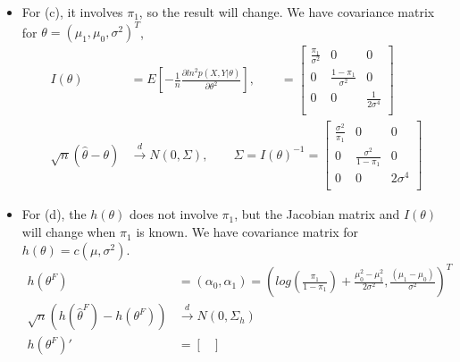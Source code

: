 \documentclass[11pt]{article} %
\begin{document}
\begin{itemize}
\begin{itemize}
\begin{align*}
\begin{bmatrix}
				\sum_{i=1}^n \pi_1 (1-\pi_1)x_i &  \sum_{i=1}^n \pi_1 (1-\pi_1)x_ix_i^T\\
			\end{bmatrix}\\
			Cov(\alpha) &= I_n(\alpha)^{-1} = \frac{1}{[\sum_{i=1}^n n x_i^2 - (\sum_{i=1}^n x_i)^2]\pi_1 (1-\pi_1)}  \begin{bmatrix}
				\sum_{i=1}^n n x_i^2 &   -\sum_{i=1}^n x_i\\
				-\sum_{i=1}^n x_i\sum_{i=1}^n \pi_1 (1-\pi_1)x_i & n\\
			\end{bmatrix}
		\end{align*} 
		\item[(ii)] For (c), it involves $\pi_1$, so the result will change. We have covariance matrix for $\theta = (\mu_1, \mu_0, \sigma^2)^T$, 
		\begin{align*}    
			I(\theta) &= E[- \frac{1}{n} \frac{\partial ln^2 p(X,Y|\theta)}{\partial \theta^2}], \qquad
			= \begin{bmatrix}
				\frac{\pi_1}{\sigma^2} & 0 & 0\\
				0 & \frac{1-\pi_1}{\sigma^2} & 0\\
				0 & 0 & \frac{1}{2\sigma^4} \\
			\end{bmatrix}\\
			\sqrt{n} (\hat{\theta} - \theta) & \xrightarrow[]{d} N \left(0, \Sigma \right), \qquad
			\Sigma = I(\theta)^{-1} = \begin{bmatrix}
				\frac{\sigma^2}{ \pi_1} & 0 & 0\\
				0 & \frac{\sigma^2}{ 1-\pi_1} & 0\\
				0 & 0 & 2\sigma^4 \\
			\end{bmatrix}
		\end{align*} 
		\item[(iii)] For (d), the $h(\theta)$ does not involve $\pi_1$, but the Jacobian matrix and $I(\theta)$ will change when $\pi_1$ is known. We have covariance matrix for $h(\theta) = c(\mu, \sigma^2)$.
		\begin{align*}    
			h(\theta^F ) &= (\alpha_0, \alpha_1)= \left(log(\frac{\pi_1}{1-\pi_1}) +\frac{\mu_0^2 - \mu_1^2}{2\sigma^2},  \frac{(\mu_1-\mu_0)}{\sigma^2} \right)^T\\
			\sqrt{n} (h(\hat\theta^F ) - h(\theta^F )) & \xrightarrow[]{d} N \left(0, \Sigma_ h \right)\\
			h(\theta^F )' &= \begin{bmatrix}

\end{bmatrix}
\end{align*}
\end{itemize}
\end{itemize}
\end{document}
